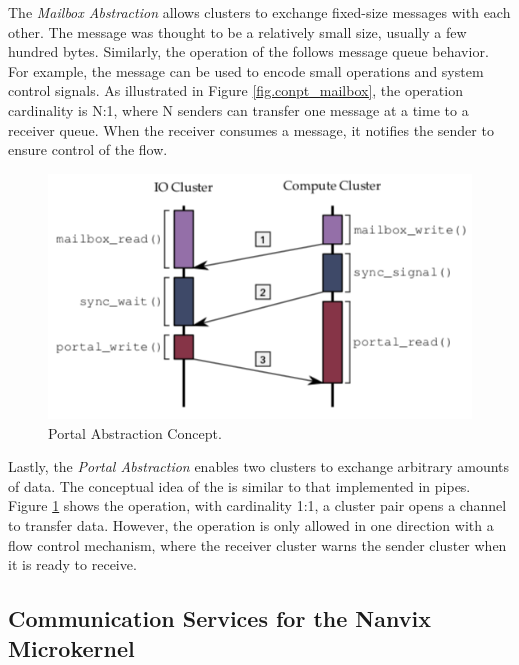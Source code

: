 				The \textit{Mailbox Abstraction} allows clusters to exchange fixed-size
				messages with each other.
				The message was thought to be a relatively small size, usually a few hundred bytes.
				Similarly, the operation of the \mailbox follows \posix message queue behavior.
				For example, the message can be used to encode small operations and system
				control signals.
				As illustrated in Figure \ref{fig.conpt_mailbox}, the operation cardinality is N:1,
				where N senders can transfer one message at a time to a receiver queue.
				When the receiver consumes a message, it notifies the sender to ensure
				control of the flow.

			\label{sec.portal-abs}

				\begin{figure}[h]
					\centering
					\includegraphics[width=.7\textwidth]{images/conceptual-sync.png}
					\caption{
						Portal Abstraction Concept.
					}\par
					\label{fig.conpt_portal}
				\end{figure}

				Lastly, the \textit{Portal Abstraction} enables two clusters to exchange arbitrary
				amounts of data.
				The conceptual idea of the \portal is similar to that implemented in \posix pipes.
				Figure \ref{fig.conpt_portal} shows the \portal operation, with cardinality
				1:1, a cluster pair opens a channel to transfer data.
				However, the operation is only allowed in one direction with a flow control mechanism,
				where the receiver cluster warns the sender cluster when it is ready to receive.
			
		\subsection{Communication Services for the Nanvix Microkernel}
		
